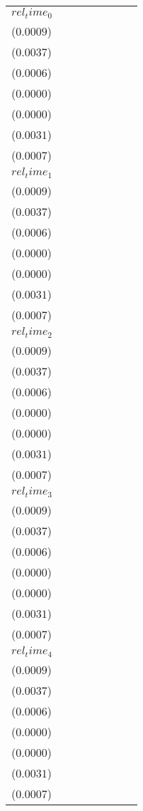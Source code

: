 \begin{tabular}{llllllll}
$rel_time_0$ & \makecell{$0.0014^{}$ \\ ($0.0009$)} & \makecell{$0.0070^{*}$ \\ ($0.0037$)} & \makecell{$-0.0012^{**}$ \\ ($0.0006$)} & \makecell{$-0.0001^{***}$ \\ ($0.0000$)} & \makecell{$-0.0001^{***}$ \\ ($0.0000$)} & \makecell{$0.0039^{}$ \\ ($0.0031$)} & \makecell{$0.0007^{}$ \\ ($0.0007$)} \\
$rel_time_1$ & \makecell{$0.0021^{**}$ \\ ($0.0009$)} & \makecell{$0.0090^{**}$ \\ ($0.0037$)} & \makecell{$-0.0014^{**}$ \\ ($0.0006$)} & \makecell{$-0.0002^{***}$ \\ ($0.0000$)} & \makecell{$-0.0001^{***}$ \\ ($0.0000$)} & \makecell{$0.0050^{}$ \\ ($0.0031$)} & \makecell{$0.0012^{*}$ \\ ($0.0007$)} \\
$rel_time_2$ & \makecell{$0.0033^{***}$ \\ ($0.0009$)} & \makecell{$0.0141^{***}$ \\ ($0.0037$)} & \makecell{$-0.0018^{***}$ \\ ($0.0006$)} & \makecell{$-0.0001^{***}$ \\ ($0.0000$)} & \makecell{$-0.0001^{***}$ \\ ($0.0000$)} & \makecell{$0.0102^{***}$ \\ ($0.0031$)} & \makecell{$0.0024^{***}$ \\ ($0.0007$)} \\
$rel_time_3$ & \makecell{$0.0039^{***}$ \\ ($0.0009$)} & \makecell{$0.0167^{***}$ \\ ($0.0037$)} & \makecell{$-0.0028^{***}$ \\ ($0.0006$)} & \makecell{$-0.0002^{***}$ \\ ($0.0000$)} & \makecell{$-0.0001^{***}$ \\ ($0.0000$)} & \makecell{$0.0122^{***}$ \\ ($0.0031$)} & \makecell{$0.0028^{***}$ \\ ($0.0007$)} \\
$rel_time_4$ & \makecell{$0.0029^{***}$ \\ ($0.0009$)} & \makecell{$0.0132^{***}$ \\ ($0.0037$)} & \makecell{$-0.0033^{***}$ \\ ($0.0006$)} & \makecell{$-0.0003^{***}$ \\ ($0.0000$)} & \makecell{$-0.0001^{***}$ \\ ($0.0000$)} & \makecell{$0.0094^{***}$ \\ ($0.0031$)} & \makecell{$0.0020^{***}$ \\ ($0.0007$)} \\

\end{tabular}
